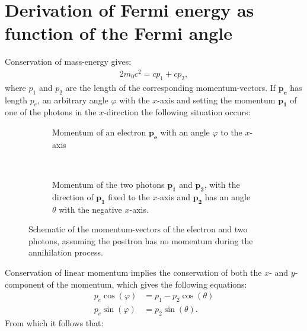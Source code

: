 \section{Derivation of Fermi energy as function of the Fermi angle}\label{ap:fermi}
Conservation of mass-energy gives:\begin{gather*}
2m_0c^2 = cp_1 + cp_2,
\end{gather*}where $p_1$ and $p_2$ are the length of the corresponding momentum-vectors. If $\boldsymbol{p_e}$ has length $p_e$, an arbitrary angle $\varphi$ with the $x$-axis and setting the momentum $\boldsymbol{p_1}$ of one of the photons in the $x$-direction the following situation occurs:
\begin{figure}[H]
	\centering
	\begin{subfigure}[t]{0.45\linewidth}
		\centering
		\resizebox{\linewidth}{!}{}
		\caption{Momentum of an electron $\boldsymbol{p_e}$ with an angle $\varphi$ to the $x$-axis}
		\label{fig:momentumvectors1}
	\end{subfigure}
	~
	\begin{subfigure}[t]{0.45\linewidth}
		\centering
		\resizebox{\linewidth}{!}{}
		\caption{Momentum of the two photons $\boldsymbol{p_1}$ and $\boldsymbol{p_2}$, with the direction of $\boldsymbol{p_1}$ fixed to the $x$-axis and $\boldsymbol{p_2}$ has an angle $\theta$ with the negative $x$-axis.}
		\label{fig:momentumvectors2}
	\end{subfigure}
	\caption{Schematic of the momentum-vectors of the electron and two photons, assuming the positron has no momentum during the annihilation process.}
	\label{fig:momentumvectoren}
\end{figure}Conservation of linear momentum implies the conservation of both the $x$- and $y$-component of the momentum, which gives the following equations:
\begin{align*}
p_e\cos(\varphi) &= p_1 - p_2\cos(\theta)\\
p_e\sin(\varphi) &= p_2\sin(\theta).
\end{align*} From which it follows that:
